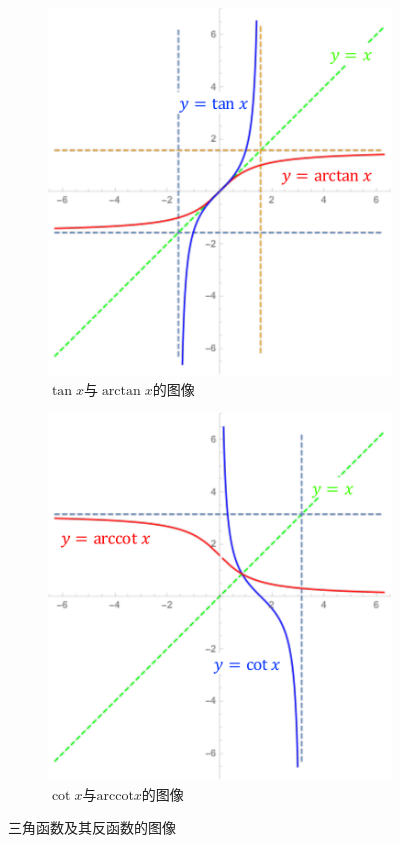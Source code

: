 \begin{figure}[h]
	\begin{subfigure}[t]{0.45\textwidth}
		\centering
		\includegraphics[width=\textwidth]
		{./Images/Ch01/tan-Arctan.pdf}	
		\caption{$\tan x$与$\arctan x$的图像}
		\label{subfig:arctan}
	\end{subfigure}
	\begin{subfigure}[t]{0.45\textwidth}
		\centering
		\includegraphics[width=\textwidth]
		{./Images/Ch01/cot-Arccot.pdf}	
		\caption{$\cot x$与$\mathrm{arccot} x$的图像}
	\end{subfigure}
	\caption{三角函数及其反函数的图像}
	\label{fig:triFunc}
\end{figure}

